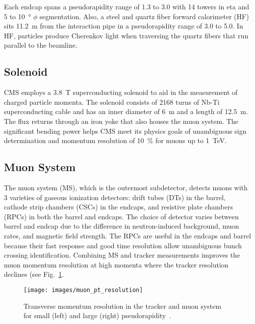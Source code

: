 \documentclass[12pt]{article}
\begin{document}
        Each endcap spans a pseudorapidity range of \num{1.3} to \num{3.0} with \num{14} towers in eta and \num{5} to \SI{10}{\degree} $\phi$ segmentation. Also, a steel and quartz fiber forward calorimeter (HF) sits \SI{11.2}{m} from the interaction pipe in a pseudorapidity range of \num{3.0} to \num{5.0}. In HF, particles produce Cherenkov light when traversing the quartz fibers that run parallel to the beamline.

    \subsection{Solenoid}
        CMS employs a \SI{3.8}{T} superconducting solenoid to aid in the measurement of charged particle momenta. The solenoid consists of \num{2168} turns of Nb-Ti superconducting cable and has an inner diameter of \SI{6}{m} and a length of \SI{12.5}{m}. The flux returns through an iron yoke that also houses the muon system. The significant  bending power helps CMS meet its physics goals of unambiguous sign determination and momentum resolution of \SI{10}{\percent} for muons up to \SI{1}{\tera\electronvolt}\cite{cms_experiment}.

    \subsection{Muon System}
        The muon system (MS), which is the outermost subdetector, detects muons with \num{3} varieties of gaseous ionization detectors: drift tubes (DTs) in the barrel, cathode strip chambers (CSCs) in the endcaps, and resistive plate chambers (RPCs) in both the barrel and endcaps. The choice of detector varies between barrel and endcap due to the difference in neutron-induced background, muon rates, and magnetic field strength. The RPCs are useful in the endcaps and barrel because their fast response and good time resolution allow unambiguous bunch crossing identification. Combining MS and tracker measurements improves the muon momentum resolution at high momenta where the tracker resolution declines (see Fig.~\ref{muon_pt_resolution}\cite{cms_experiment, cms_tdr}.

        \noindent \begin{figure}[htbp] \begin{center}
        \texttt{[image: images/muon\_pt\_resolution]}
        \caption{Transverse momentum resolution in the tracker and muon system for small (left) and large (right) pseudorapidity~\cite{cms_image}.}
        \label{muon_pt_resolution}
        \end{center} \end{figure}
\end{document}
